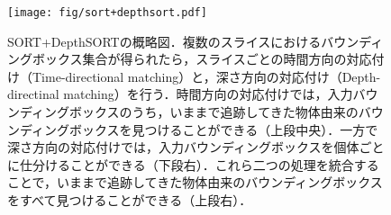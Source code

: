         \begin{figure}[t]
            \centering
            \texttt{[image: fig/sort+depthsort.pdf]}
            \caption[SORT+DepthSORTの概略図]{SORT+DepthSORTの概略図．複数のスライスにおけるバウンディングボックス集合が得られたら，スライスごとの時間方向の対応付け（Time-directional matching）と，深さ方向の対応付け（Depth-directinal matching）を行う．時間方向の対応付けでは，入力バウンディングボックスのうち，いままで追跡してきた物体由来のバウンディングボックスを見つけることができる（上段中央）．一方で深さ方向の対応付けでは，入力バウンディングボックスを個体ごとに仕分けることができる（下段右）．これら二つの処理を統合することで，いままで追跡してきた物体由来のバウンディングボックスをすべて見つけることができる（上段右）．}
            \label{fig:sort_depthsort}
        \end{figure}

